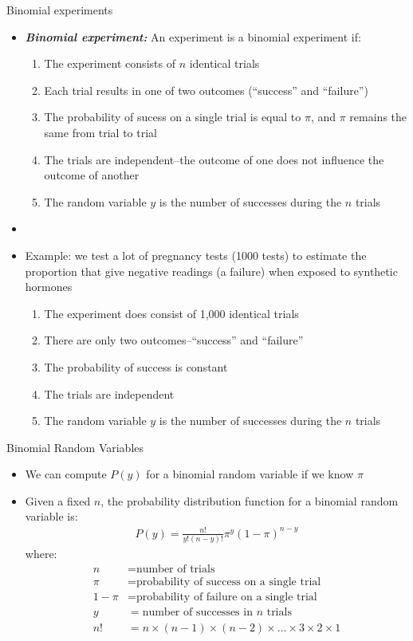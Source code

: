 \documentclass[xcolor=dvipsnames]{beamer}
\begin{document}
\begin{frame}{Binomial experiments}
	\begin{itemize}
		\item \textbf{\emph{Binomial experiment:}} An experiment is a binomial experiment if: \pause
		\begin{enumerate}
			\item The experiment consists of $n$ identical trials \pause
			\item Each trial results in one of two outcomes (``success'' and ``failure'') \pause
			\item The probability of sucess on a single trial is equal to $\pi$, and $\pi$ remains the same from trial to trial \pause
			\item The trials are independent--the outcome of one does not influence the outcome of another \pause
			\item The random variable $y$ is the number of successes during the $n$ trials
		\end{enumerate}
	\item[]
	\item Example: we test a lot of pregnancy tests (1000 tests) to estimate the proportion that give negative readings (a failure) when exposed to synthetic hormones \pause
	\begin{enumerate}
		\item The experiment does consist of 1,000 identical trials \pause
		\item There are only two outcomes--``success'' and ``failure'' \pause
		\item The probability of success is constant \pause
		\item The trials are independent \pause
		\item The random variable $y$ is the number of successes during the $n$ trials
	\end{enumerate}
	\end{itemize}
\end{frame}

\begin{frame}{Binomial Random Variables}
	\begin{itemize}
		\item We can compute $P(y)$ for a binomial random variable if we know $\pi$ \pause
		\item Given a fixed $n$, the probability distribution function for a binomial random variable is: 
		\begin{gather*}
		P(y) = \frac{n!}{y!(n-y)!} \pi^y (1-\pi)^{n-y}
		\end{gather*} \pause
		where:
		\begin{align*}
		n &= \text{number of trials} \\
		\pi &= \text{probability of success on a single trial} \\ 
		1- \pi &= \text{probability of failure on a single trial} \\
		y &= \text{number of successes in $n$ trials} \\
		n! &= n \times (n-1) \times (n-2) \times \hdots \times 3 \times 2 \times 1
		\end{align*}
	\end{itemize}
\end{frame}
\end{document}
